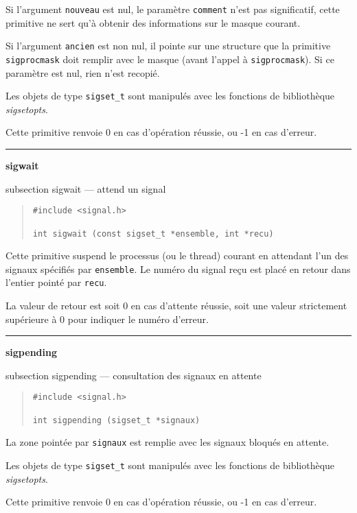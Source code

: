 \documentclass [twoside] {report}
\newcommand {\primitive} [1]
    {
	\phantomsection
	{\large \textbf {#1}}
	\addcontentsline {toc} {subsection} {#1}
    }
\newcommand {\separation}
    {
	\vspace {5mm}
	\nopagebreak
	\hrule
    }
\begin{document}
Si l'argument \texttt {nouveau} est nul, le paramètre \texttt {comment}
n'est pas significatif, cette primitive ne sert qu'à obtenir des
informations sur le masque courant.

Si l'argument \texttt {ancien} est non nul, il pointe sur une structure que
la primitive \texttt {sigprocmask} doit remplir avec le masque (avant
l'appel à \texttt {sigprocmask}).  Si ce paramètre est nul, rien n'est
recopié.

Les objets de type \texttt {sigset\_t} sont manipulés avec les fonctions de
bibliothèque \emph {sigsetopts}.

Cette primitive renvoie 0 en cas d'opération réussie, ou -1 en cas
d'erreur.



\separation
\primitive {sigwait} --- attend un signal
    \label {sigwait}

\begin {quote}
\begin {verbatim}
#include <signal.h>

int sigwait (const sigset_t *ensemble, int *recu)
\end{verbatim}
\end {quote}

Cette primitive suspend le processus (ou le thread) courant en attendant
l'un des signaux spécifiés par \texttt {ensemble}. Le numéro du signal
reçu est placé en retour dans l'entier pointé par \texttt {recu}.

La valeur de retour est soit 0 en cas d'attente réussie, soit une valeur
strictement supérieure à 0 pour indiquer le numéro d'erreur.


\separation
\primitive {sigpending} --- consultation des signaux en attente

\begin {quote}
\begin {verbatim}
#include <signal.h>

int sigpending (sigset_t *signaux)
\end{verbatim}
\end {quote}

La zone pointée par \texttt {signaux} est remplie avec les signaux bloqués
en attente.

Les objets de type \texttt {sigset\_t} sont manipulés avec les fonctions de
bibliothèque \emph {sigsetopts}.

Cette primitive renvoie 0 en cas d'opération réussie, ou -1 en cas
d'erreur.
\end{document}
